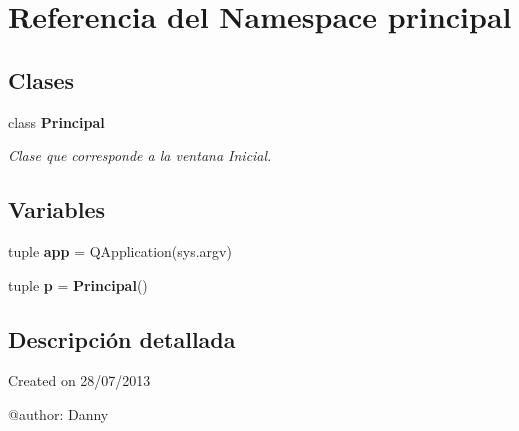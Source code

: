 \section{Referencia del Namespace principal}
\label{namespaceprincipal}
\subsection*{Clases}
\begin{DoxyCompactItemize}
\item 
class {\bf Principal}
\begin{DoxyCompactList}\small\item\em Clase que corresponde a la ventana Inicial. \end{DoxyCompactList}\end{DoxyCompactItemize}
\subsection*{Variables}
\begin{DoxyCompactItemize}
\item 
tuple {\bfseries app} = Q\-Application(sys.\-argv)\label{namespaceprincipal_a66af7b07bec9184a1650e4238c31e935}

\item 
tuple {\bfseries p} = {\bf Principal}()\label{namespaceprincipal_aa08db0b84078f3702b73b77c1a6e9adb}

\end{DoxyCompactItemize}


\subsection{Descripción detallada}
\begin{DoxyVerb}Created on 28/07/2013

@author: Danny
\end{DoxyVerb}
 